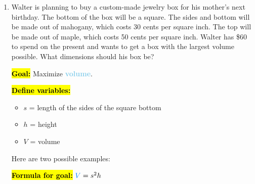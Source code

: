 \documentclass{article}
\newcommand{\highlight}[1]{\boldmath\hl{\textbf{#1}}\unboldmath}
\newcommand{\goal}[1]{\textbf{\textcolor{skyblue}{#1}}}
\begin{document}
\begin{enumerate}[resume]
\item  \label{optimization-walter-jewelry-box}


  \begin{problem}[\vfill\newpage]
    Walter is planning to buy a custom-made jewelry box for his mother's next birthday. The bottom of the box will be a square. The sides and bottom will be made out of mahogany, which costs 30 cents per square inch. The top will be made out of maple, which costs 50 cents per square inch. Walter has \$60 to spend on the present and wants to get a box with the largest volume possible. What dimensions should his box be?
  \end{problem}

  \begin{solution}
    \highlight{Goal:} Maximize \goal{volume}.

    \highlight{Define variables:}
    \begin{itemize}[nosep]
    \item $s$ = length of the sides of the square bottom
    \item $h$ = height
    \item $V$ = volume
    \end{itemize}
    Here are two possible examples:
    \begin{center}
      \qquad 
    \end{center}

    \highlight{Formula for goal:} $\goal{$V$} = s^2 h$


\end{solution}
\end{enumerate}
\end{document}
